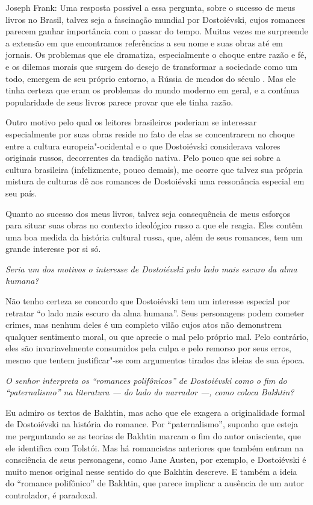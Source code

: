 \noindent
Joseph Frank: Uma resposta possível a essa pergunta, sobre o
sucesso de meus livros no Brasil, talvez seja a fascinação mundial por
Dostoiévski, cujos romances parecem ganhar importância com o passar do
tempo. Muitas vezes me surpreende a extensão em que encontramos
referências a seu nome e suas obras até em jornais. Os problemas que ele
dramatiza, especialmente o choque entre razão e fé, e os dilemas morais
que surgem do desejo de transformar a sociedade como um todo,
emergem de seu próprio entorno, a Rússia de meados do século . Mas ele
tinha certeza que eram os problemas do mundo moderno em geral, e a
contínua popularidade de seus livros parece provar que ele tinha razão.

Outro motivo pelo qual os leitores brasileiros poderiam se interessar
especialmente por suas obras reside no fato de elas se concentrarem no choque entre
a cultura europeia"-ocidental e o que Dostoiévski considerava valores
originais russos, decorrentes da tradição nativa. Pelo pouco que sei
sobre a cultura brasileira (infelizmente, pouco demais), me
ocorre que talvez sua própria mistura de culturas dê aos romances de
Dostoiévski uma ressonância especial em seu país.

Quanto ao sucesso dos meus livros, talvez seja consequência de meus
esforços para situar suas obras no contexto ideológico russo a que ele
reagia. Eles contêm uma boa medida da história cultural russa, que, além
de seus romances, tem um grande interesse por si só.

\medskip

\emph{Seria um dos motivos o interesse de Dostoiévski pelo lado mais
escuro da alma humana?}

Não tenho certeza se concordo que Dostoiévski tem um interesse
especial por retratar ``o lado mais escuro da alma humana''. Seus
personagens podem cometer crimes, mas nenhum deles é um completo vilão
cujos atos não demonstrem qualquer sentimento moral, ou que aprecie o
mal pelo próprio mal. Pelo contrário, eles são invariavelmente
consumidos pela culpa e pelo remorso por seus erros, mesmo que
tentem justificar"-se com argumentos tirados das ideias de sua época.

\medskip

\emph{O senhor interpreta os ``romances polifônicos'' de Dostoiévski como
o fim do ``paternalismo'' na literatura --- do lado do narrador ---,
como coloca Bakhtin?}

Eu admiro os textos de Bakhtin, mas acho que ele exagera a originalidade
formal de Dostoiévski na história do romance. Por ``paternalismo'',
suponho que esteja me perguntando se as teorias de Bakhtin marcam o fim
do autor onisciente, que ele identifica com Tolstói. Mas há romancistas
anteriores que também entram na consciência de seus personagens, como
Jane Austen, por exemplo, e Dostoiévski é muito menos original nesse
sentido do que Bakhtin descreve. E também a ideia do ``romance polifônico''
de Bakhtin, que parece implicar a ausência de um autor controlador, é
paradoxal.

